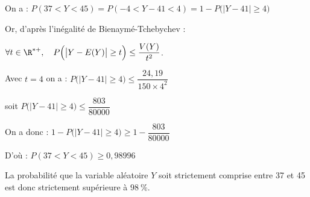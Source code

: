 On a  : $P(37<Y<45) = P(-4< Y-41<4) = 1- P\Big(\big|Y-41\big| \geq 4\Big)$

Or, d'après l'inégalité de Bienaymé-Tchebychev :

$\forall t \in \R^{*+}, \quad P\Big(\big|Y - E(Y)\big| \geq t\Big) \leq  \dfrac{V(Y)}{t^2 } $.

Avec $t= 4$  on  a : $P\Big(\big|Y- 41\big| \geq 4\Big) \leq  \dfrac{24,19}{150 \times 4^2 } $

soit  $ P\Big(\big|Y-41\big| \geq 4\Big) \leq \dfrac{ 803}{80000}$

On a donc :  $1- P\Big(\big|Y-41\big| \geq 4\Big) \geq 1- \dfrac{ 803}{80000}$

D'où : $P(37<Y<45) \geq 0,98996$


La probabilité que la variable aléatoire $Y$ soit strictement comprise entre 37 et 45 est donc strictement supérieure à $98~\%$.
